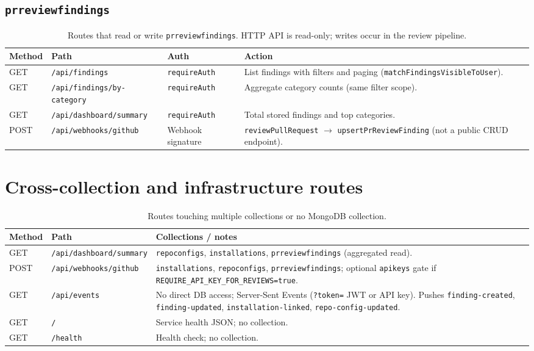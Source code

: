 \subsection{\texttt{prreviewfindings}}

\begin{table}[htbp]
  \centering
  \caption{Routes that read or write \texttt{prreviewfindings}. HTTP API is read-only; writes occur in the review pipeline.}
  \label{tab:routes-findings}
  \begin{tabular}{@{}lllp{}@{}}
    \toprule
    \textbf{Method} & \textbf{Path} & \textbf{Auth} & \textbf{Action} \\
    \midrule
    GET & \texttt{/api/findings}             & \texttt{requireAuth} & List findings with filters and paging (\texttt{matchFindingsVisibleToUser}). \\
    GET & \texttt{/api/findings/by-category} & \texttt{requireAuth} & Aggregate category counts (same filter scope). \\
    GET & \texttt{/api/dashboard/summary}    & \texttt{requireAuth} & Total stored findings and top categories. \\
    POST & \texttt{/api/webhooks/github}     & Webhook signature  & \texttt{reviewPullRequest} $\rightarrow$ \texttt{upsertPrReviewFinding} (not a public CRUD endpoint). \\
    \bottomrule
  \end{tabular}
\end{table}

\section{Cross-collection and infrastructure routes}
\label{sec:cross-routes}

\begin{table}[htbp]
  \centering
  \caption{Routes touching multiple collections or no MongoDB collection.}
  \label{tab:routes-cross}
  \begin{tabular}{@{}llp{}@{}}
    \toprule
    \textbf{Method} & \textbf{Path} & \textbf{Collections / notes} \\
    \midrule
    GET  & \texttt{/api/dashboard/summary} &
    \texttt{repoconfigs}, \texttt{installations}, \texttt{prreviewfindings} (aggregated read). \\
    POST & \texttt{/api/webhooks/github} &
    \texttt{installations}, \texttt{repoconfigs}, \texttt{prreviewfindings}; optional \texttt{apikeys} gate if \texttt{REQUIRE\_API\_KEY\_FOR\_REVIEWS=true}. \\
    GET  & \texttt{/api/events} &
    No direct DB access; Server-Sent Events (\texttt{?token=} JWT or API key). Pushes \texttt{finding-created}, \texttt{finding-updated}, \texttt{installation-linked}, \texttt{repo-config-updated}. \\
    GET  & \texttt{/} & Service health JSON; no collection. \\
    GET  & \texttt{/health} & Health check; no collection. \\
    \bottomrule
  \end{tabular}
\end{table}

